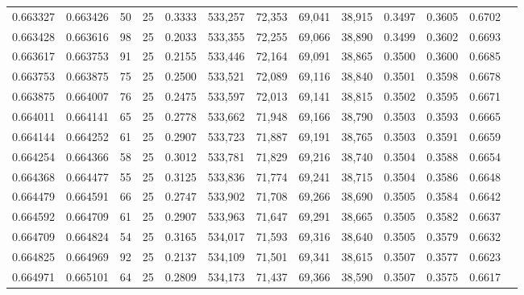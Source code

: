 \begin{tabular}{rrrrrrrrrrrrr}
0.663327 & 0.663426 &    50 &  25 &                                     0.3333 & 533,257 &  72,353 &  69,041 &  38,915 & 0.3497 & 0.3605 & 0.6702 \\
0.663428 & 0.663616 &    98 &  25 &                                     0.2033 & 533,355 &  72,255 &  69,066 &  38,890 & 0.3499 & 0.3602 & 0.6693 \\
0.663617 & 0.663753 &    91 &  25 &                                     0.2155 & 533,446 &  72,164 &  69,091 &  38,865 & 0.3500 & 0.3600 & 0.6685 \\
0.663753 & 0.663875 &    75 &  25 &                                     0.2500 & 533,521 &  72,089 &  69,116 &  38,840 & 0.3501 & 0.3598 & 0.6678 \\
0.663875 & 0.664007 &    76 &  25 &                                     0.2475 & 533,597 &  72,013 &  69,141 &  38,815 & 0.3502 & 0.3595 & 0.6671 \\
0.664011 & 0.664141 &    65 &  25 &                                     0.2778 & 533,662 &  71,948 &  69,166 &  38,790 & 0.3503 & 0.3593 & 0.6665 \\
0.664144 & 0.664252 &    61 &  25 &                                     0.2907 & 533,723 &  71,887 &  69,191 &  38,765 & 0.3503 & 0.3591 & 0.6659 \\
0.664254 & 0.664366 &    58 &  25 &                                     0.3012 & 533,781 &  71,829 &  69,216 &  38,740 & 0.3504 & 0.3588 & 0.6654 \\
0.664368 & 0.664477 &    55 &  25 &                                     0.3125 & 533,836 &  71,774 &  69,241 &  38,715 & 0.3504 & 0.3586 & 0.6648 \\
0.664479 & 0.664591 &    66 &  25 &                                     0.2747 & 533,902 &  71,708 &  69,266 &  38,690 & 0.3505 & 0.3584 & 0.6642 \\
0.664592 & 0.664709 &    61 &  25 &                                     0.2907 & 533,963 &  71,647 &  69,291 &  38,665 & 0.3505 & 0.3582 & 0.6637 \\
0.664709 & 0.664824 &    54 &  25 &                                     0.3165 & 534,017 &  71,593 &  69,316 &  38,640 & 0.3505 & 0.3579 & 0.6632 \\
0.664825 & 0.664969 &    92 &  25 &                                     0.2137 & 534,109 &  71,501 &  69,341 &  38,615 & 0.3507 & 0.3577 & 0.6623 \\
0.664971 & 0.665101 &    64 &  25 &                                     0.2809 & 534,173 &  71,437 &  69,366 &  38,590 & 0.3507 & 0.3575 & 0.6617 \\

\end{tabular}
